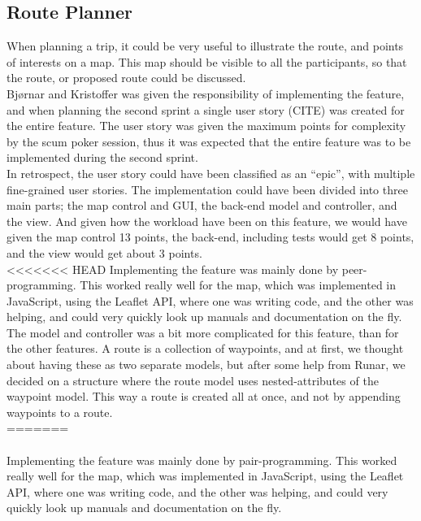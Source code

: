 \documentclass[a4paper]{article}
\begin{document}
\subsection{Route Planner}
When planning a trip, it could be very useful to illustrate the route, and points of interests on a map. This map should be visible to all the participants, so that the route, or proposed route could be discussed.\\

\noindent
Bjørnar and Kristoffer was given the responsibility of implementing the feature, and when planning the second sprint a single user story (CITE) was created for the entire feature. The user story was given the maximum points for complexity by the scum poker session, thus it was expected that the entire feature was to be implemented during the second sprint.\\

\noindent
In retrospect, the user story could have been classified as an “epic”, with multiple fine-grained user stories. The implementation could have been divided into three main parts; the map control and GUI, the back-end model and controller, and the view. And given how the workload have been on this feature, we would have given the map control 13 points, the back-end, including tests would get 8 points, and the view would get about 3 points.\\

<<<<<<< HEAD
\noindent
Implementing the feature was mainly done by peer-programming. This worked really well for the map, which was implemented in JavaScript, using the Leaflet API, where one was writing code, and the other was helping, and could very quickly look up manuals and documentation on the fly.\\

\noindent
The model and controller was a bit more complicated for this feature, than for the other features. A route is a collection of waypoints, and at first, we thought about having these as two separate models,  but after some help from Runar, we decided on a structure where the route model uses nested-attributes of the waypoint model. This way a route is created all at once, and not by appending waypoints to a route. \\
=======
\paragraph{}Implementing the feature was mainly done by pair-programming. This worked really well for the map, which was implemented in JavaScript, using the Leaflet API, where one was writing code, and the other was helping, and could very quickly look up manuals and documentation on the fly.
\end{document}
